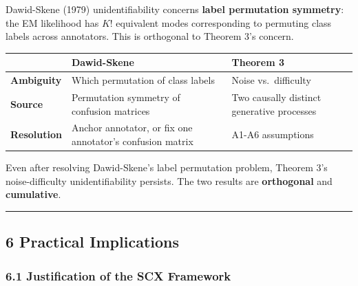 \documentclass[
  12pt,
]{ctexart}
\begin{document}
Dawid-Skene (1979) unidentifiability concerns \textbf{label permutation
symmetry}: the EM likelihood has \(K!\) equivalent modes corresponding
to permuting class labels across annotators. This is orthogonal to
Theorem 3's concern.

\begin{longtable}[]{@{}
  >{\raggedright\arraybackslash}p{}
  >{\raggedright\arraybackslash}p{}
  >{\raggedright\arraybackslash}p{}@{}}
\toprule\noalign{}
\begin{minipage}[b]{\linewidth}\raggedright
\end{minipage} & \begin{minipage}[b]{\linewidth}\raggedright
Dawid-Skene
\end{minipage} & \begin{minipage}[b]{\linewidth}\raggedright
Theorem 3
\end{minipage} \\
\midrule\noalign{}
\endhead
\bottomrule\noalign{}
\endlastfoot
\textbf{Ambiguity} & Which permutation of class labels & Noise
vs.~difficulty \\
\textbf{Source} & Permutation symmetry of confusion matrices & Two
causally distinct generative processes \\
\textbf{Resolution} & Anchor annotator, or fix one annotator's confusion
matrix & A1-A6 assumptions \\
\end{longtable}

Even after resolving Dawid-Skene's label permutation problem, Theorem
3's noise-difficulty unidentifiability persists. The two results are
\textbf{orthogonal} and \textbf{cumulative}.

\begin{center}\rule{0.5\linewidth}{0.5pt}\end{center}

\subsection{6 Practical Implications}\label{practical-implications}

\subsubsection{6.1 Justification of the SCX
Framework}\label{justification-of-the-scx-framework}
\end{document}
